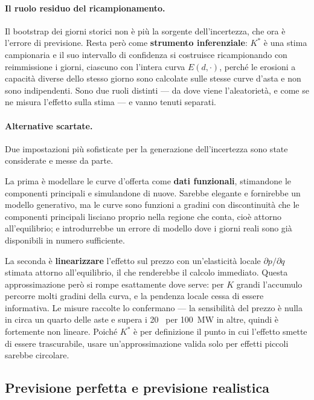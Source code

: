 \paragraph{Il ruolo residuo del ricampionamento.} Il bootstrap dei giorni storici non \`e
pi\`u la sorgente dell'incertezza, che ora \`e l'errore di previsione. Resta per\`o come
\textbf{strumento inferenziale}: $K^*$ \`e una stima campionaria e il suo intervallo di
confidenza si costruisce ricampionando con reimmissione i giorni, ciascuno con l'intera
curva $E(d,\cdot)$, perch\'e le erosioni a capacit\`a diverse dello stesso giorno sono
calcolate sulle stesse curve d'asta e non sono indipendenti. Sono due ruoli distinti --- da
dove viene l'aleatoriet\`a, e come se ne misura l'effetto sulla stima --- e vanno tenuti
separati.

\paragraph{Alternative scartate.} Due impostazioni pi\`u sofisticate per la generazione
dell'incertezza sono state considerate e messe da parte.

La prima \`e modellare le curve d'offerta come \textbf{dati funzionali}, stimandone le
componenti principali e simulandone di nuove. Sarebbe elegante e fornirebbe un modello
generativo, ma le curve sono funzioni a gradini con discontinuit\`a che le componenti
principali lisciano proprio nella regione che conta, cio\`e attorno all'equilibrio; e
introdurrebbe un errore di modello dove i giorni reali sono gi\`a disponibili in numero
sufficiente.

La seconda \`e \textbf{linearizzare} l'effetto sul prezzo con un'elasticit\`a locale
$\partial p / \partial q$ stimata attorno all'equilibrio, il che renderebbe il calcolo
immediato. Questa approssimazione per\`o si rompe esattamente dove serve: per $K$ grandi
l'accumulo percorre molti gradini della curva, e la pendenza locale cessa di essere
informativa. Le misure raccolte lo confermano --- la sensibilit\`a del prezzo \`e nulla in
circa un quarto delle aste e supera i 20~\euromwh{} per 100~MW in altre, quindi \`e
fortemente non lineare. Poich\'e $K^*$ \`e per definizione il punto in cui l'effetto smette
di essere trascurabile, usare un'approssimazione valida solo per effetti piccoli sarebbe
circolare.

\subsection{Previsione perfetta e previsione realistica}
\label{sec:due-varianti}

